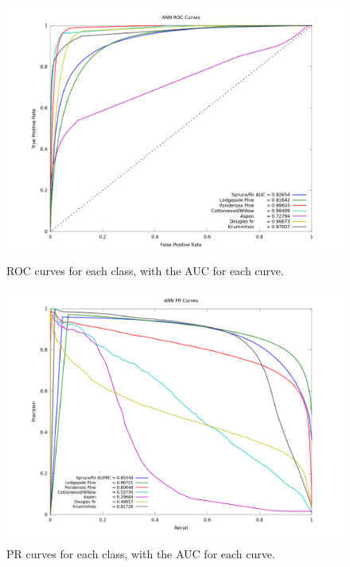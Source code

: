 \documentclass[12pt]{article}
\begin{document}
\begin{figure}[H]
\includegraphics[width=\linewidth]{images/ROC_comp.png}
\caption{ROC curves for each class, with the AUC for each curve.}
\end{figure}

\begin{figure}[H]
\includegraphics[width=\linewidth]{images/PR_comp.png} 
\caption{PR curves for each class, with the AUC for each curve.}
\end{figure}
\end{document}
